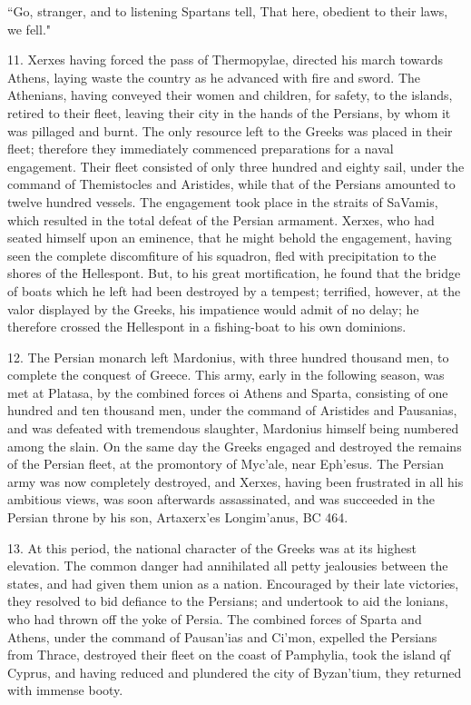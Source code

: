 \documentclass[openany,a4paper]{memoir}
\begin{document}
``Go, stranger, and to listening Spartans tell, 
That here, obedient to their laws, we fell." 

11. Xerxes having forced the pass of Thermopylae, directed his march towards Athens, laying waste the country 
as he advanced with fire and sword. The Athenians, having 
conveyed their women and children, for safety, to the islands, 
retired to their fleet, leaving their city in the hands of the 
Persians, by whom it was pillaged and burnt. The only resource left to the Greeks was placed in their fleet; therefore 
they immediately commenced preparations for a naval engagement. Their fleet consisted of only three hundred and 
eighty sail, under the command of Themistocles and Aristides, 
while that of the Persians amounted to twelve hundred vessels. The engagement took place in the straits of SaVamis, 
which resulted in the total defeat of the Persian armament. 
Xerxes, who had seated himself upon an eminence, that he 
might behold the engagement, having seen the complete discomfiture of his squadron, fled with precipitation to the shores 
of the Hellespont. But, to his great mortification, he found 
that the bridge of boats which he left had been destroyed by 
a tempest; terrified, however, at the valor displayed by the 
Greeks, his impatience would admit of no delay; he therefore 
crossed the Hellespont in a fishing-boat to his own dominions. 

12. The Persian monarch left Mardonius, with three hundred thousand men, to complete the conquest of Greece. This 
army, early in the following season, was met at Platasa, by 
the combined forces oi Athens and Sparta, consisting of one 
hundred and ten thousand men, under the command of Aristides and Pausanias, and was defeated with tremendous 
slaughter, Mardonius himself being numbered among the 
slain. On the same day the Greeks engaged and destroyed 
the remains of the Persian fleet, at the promontory of 
Myc'ale, near Eph'esus. The Persian army was now completely destroyed, and Xerxes, having been frustrated in all 
his ambitious views, was soon afterwards assassinated, and 
was succeeded in the Persian throne by his son, Artaxerx'es 
Longim'anus, BC 464. 

13. At this period, the national character of the Greeks 
was at its highest elevation. The common danger had annihilated all petty jealousies between the states, and had given 
them union as a nation. Encouraged by their late victories, 
they resolved to bid defiance to the Persians; and undertook 
to aid the lonians, who had thrown off the yoke of Persia. 
The combined forces of Sparta and Athens, under the command of Pausan'ias and Ci'mon, expelled the Persians from 
Thrace, destroyed their fleet on the coast of Pamphylia, took 
the island qf Cyprus, and having reduced and plundered the 
city of Byzan'tium, they returned with immense booty. 
\end{document}
